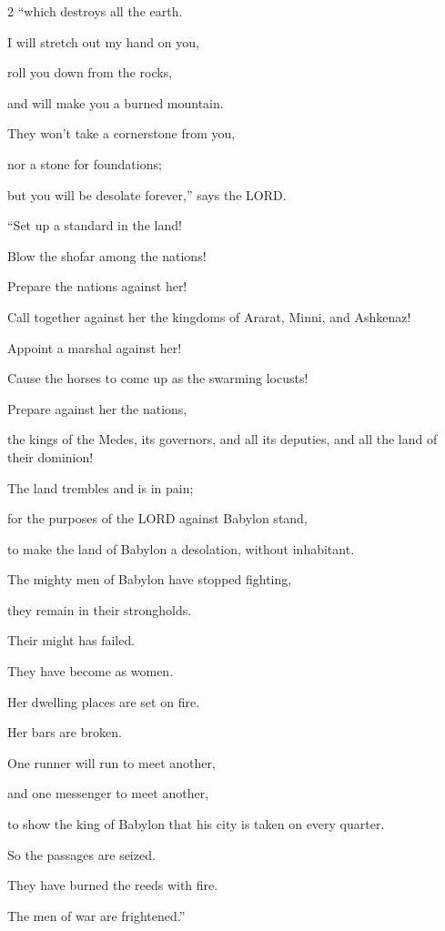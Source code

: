 \begin{multicols}{2}
“which destroys all the earth.

I will stretch out my hand on you,

roll you down from the rocks,

and will make you a burned mountain.


\myverse{}They won’t take a cornerstone from you,

nor a stone for foundations;

but you will be desolate forever,” says the LORD.

\vspace{\baselineskip}

\myverse{}“Set up a standard in the land!

Blow the shofar among the nations!

Prepare the nations against her!

Call together against her the kingdoms of Ararat, Minni, and Ashkenaz!

Appoint a marshal against her!

Cause the horses to come up as the swarming locusts!


\myverse{}Prepare against her the nations,

the kings of the Medes, its governors, and all its deputies, and all the land
of their dominion!


\myverse{}The land trembles and is in pain;

for the purposes of the LORD against Babylon stand,

to make the land of Babylon a desolation, without inhabitant.


\myverse{}The mighty men of Babylon have stopped fighting,

they remain in their strongholds.

Their might has failed.

They have become as women.

Her dwelling places are set on fire.

Her bars are broken.


\myverse{}One runner will run to meet another,

and one messenger to meet another,

to show the king of Babylon that his city is taken on every quarter.


\myverse{}So the passages are seized.

They have burned the reeds with fire.

The men of war are frightened.”



\end{multicols}
